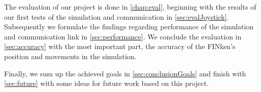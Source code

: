     The evaluation of our project is done in \ref{chap:eval}, beginning with the results of our first tests of the simulation and communication in \ref{sec:evalJoystick}.
    Subsequently we formulate the findings regarding performance of the simulation and communication link in \ref{sec:performance}.
    We conclude the evaluation in \ref{sec:accuracy} with the most important part, the accuracy of the FINken's position and movements in the simulation.
    
    Finally, we sum up the achieved goals in \ref{sec:conclusionGoals} and finish with \ref{sec:future} with some ideas for future work based on this project. 
    
